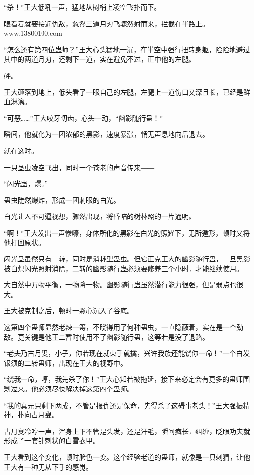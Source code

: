 
\begin{this_body}

“杀！”王大低吼一声，猛地从树梢上凌空飞扑而下。

眼看着就要接近仇敌，忽然三道月刃飞骤然射而来，拦截在半路上。www.13800100.com

“怎么还有第四位蛊师？”王大心头猛地一沉，在半空中强行扭转身躯，险险地避过其中的两道月刃，还剩下一道，实在避免不过，正中他的左腿。

砰。

王大砸落到地上，低头看了一眼自己的左腿，左腿上一道伤口又深且长，已经是鲜血淋漓。

“可恶……”王大咬牙切齿，心头一动，“幽影随行蛊！”

瞬间，他就化为一团浓郁的黑影，速度暴涨，悄无声息地向后退去。

就在这时。

一只蛊虫凌空飞出，同时一个苍老的声音传来――

“闪光蛊，爆。”

蛊虫陡然爆炸，形成一团刺眼的白光。

白光让人不可逼视想，骤然出现，将昏暗的树林照的一片通明。

“啊！”王大发出一声惨嚎，身体所化的黑影在白光的照耀下，无所遁形，顿时又将他打回原状。

闪光蛊虽然只有一转，同时是消耗型蛊虫。但它正克王大的幽影随行蛊，一旦黑影被白炽闪光照射消除，二转的幽影随行蛊必须要修养三个小时，才能继续使用。

大自然中万物平衡，一物降一物。幽影随行蛊虽然潜行能力很强，但是弱点也很大。

王大被克制之后，顿时一颗心沉入了谷底。

这第四个蛊师显然老辣一筹，不晓得用了何种蛊虫，一直隐蔽着，实在是一个劲敌。更关键是他王二暂时使用不了幽影随行蛊，这等若是没了退路。

“老夫乃古月叟，小子，你若现在就束手就擒，兴许我族还能饶你一命！”一个白发银须的二转蛊师，出现在王大的视野中。

“绕我一命，哼，我先杀了你！”王大心知若被拖延，接下来必定会有更多的蛊师围剿过来。他必须尽快解决掉这第四个蛊师。

“我的真元只剩下两成，不管是报仇还是保命，先得杀了这碍事老头！”王大强振精神，扑向古月叟。

古月叟冷哼一声，浑身上下不管是头发，还是汗毛，瞬间疯长，纠缠，眨眼功夫就形成了一套针刺状的白雪衣甲。

王大看到这个变化，顿时脸色一变。这个经验老道的蛊师，就像是一只刺猬，让他王大有一种无从下手的感觉。


\end{this_body}
